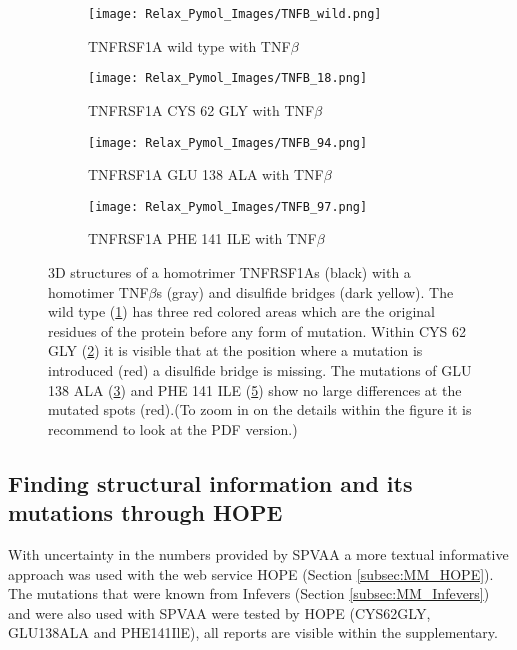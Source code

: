 		\begin{figure}[!ht]
		\centering
		\begin{subfigure}{0.49\textwidth}
			\texttt{[image: Relax\_Pymol\_Images/TNFB\_wild.png]}
			\caption{TNFRSF1A wild type with TNF$\beta$}
			\label{fig:RES_TNFB_wild}
		\end{subfigure}
		\begin{subfigure}{0.49\textwidth}
			\texttt{[image: Relax\_Pymol\_Images/TNFB\_18.png]}
			\caption{TNFRSF1A CYS 62 GLY with TNF$\beta$}
			\label{fig:RES_TNFB_18}
		\end{subfigure}
		\par\bigskip
		\begin{subfigure}{0.49\textwidth}
			\texttt{[image: Relax\_Pymol\_Images/TNFB\_94.png]}
			\caption{TNFRSF1A GLU 138 ALA with TNF$\beta$}
			\label{fig:RES_TNFB_94}
		\end{subfigure}
		\begin{subfigure}{0.49\textwidth}
			\texttt{[image: Relax\_Pymol\_Images/TNFB\_97.png]}
			\caption{TNFRSF1A PHE 141 ILE with TNF$\beta$}
			\label{fig:RES_TNFB_97}
		\end{subfigure}
	\caption[TNFRSF1A homo trimer with TNF$\beta$ homo trimers wild type and mutated relaxed models]{3D structures of a homotrimer TNFRSF1As (black) with a homotimer TNF$\beta$s (gray) and disulfide bridges (dark yellow). The wild type (\ref{fig:RES_TNFB_wild}) has three red colored areas which are the original residues of the protein before any form of mutation. Within CYS 62 GLY (\ref{fig:RES_TNFB_18}) it is visible that at the position where a mutation is introduced (red) a disulfide bridge is missing. The mutations of GLU 138 ALA (\ref{fig:RES_TNFB_94}) and PHE 141 ILE (\ref{fig:RES_TNFB_97}) show no large differences at the mutated spots (red).(To zoom in on the details within the figure it is recommend to look at the PDF version.)}
	\end{figure}
	
\newpage
	
\newpage	
\subsection{Finding structural information and its mutations through HOPE}
	With uncertainty in the numbers provided by SPVAA a more textual informative approach was used with the web service HOPE (Section \ref{subsec:MM_HOPE}). The mutations that were known from Infevers (Section \ref{subsec:MM_Infevers}) and were also used with SPVAA were tested by HOPE (CYS62GLY, GLU138ALA and PHE141IlE), all reports are visible within the supplementary.
	
